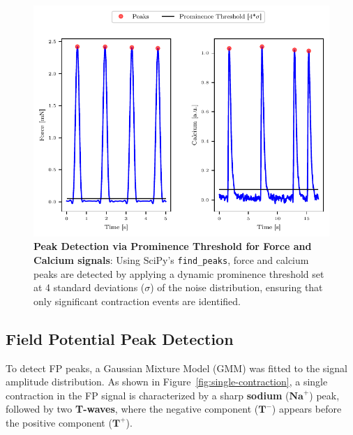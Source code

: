 \documentclass{report}
\begin{document}
    \begin{figure}[H]
        \centering

        \includegraphics[width=\textwidth, height=0.5\textheight, keepaspectratio]{plots/chapter_3/combined_peaks_plot.pdf}
        \caption[Peak Detection via Prominence Threshold for Force and Calcium signals]{\textbf{Peak Detection via Prominence Threshold for Force and Calcium signals}: Using SciPy's \texttt{find\_peaks}, force and calcium peaks are detected by applying a dynamic prominence threshold set at 4 standard deviations ($\sigma$) of the noise distribution, ensuring that only significant contraction events are identified. }
        \label{fig:force-calc-peaks}
    \end{figure}

     \subsection{Field Potential Peak Detection}
            
            To detect FP peaks, a Gaussian Mixture Model (GMM) \cite{scikit-learn_gaussian_mixture} was fitted to the signal amplitude distribution. As shown in Figure~\ref{fig:single-contraction}, a single contraction in the FP signal is characterized by a sharp \textbf{sodium} (\(\textbf{Na}^+\)) peak, followed by two \textbf{T-waves}, where the negative component (\(\textbf{T}^-\)) appears before the positive component (\(\textbf{T}^+\)).
            
\end{document}
